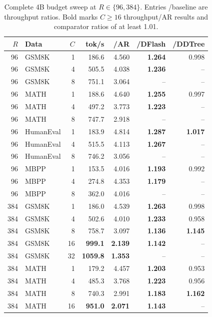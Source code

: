 \documentclass{article}
\begin{document}
\begin{table}[H]
\caption{Complete 4B budget sweep at $R\in\{96,384\}$. Entries /baseline are throughput ratios. Bold marks $C\geq16$ throughput/AR results and comparator ratios of at least 1.01.}
\label{tab:budget-4b}
\centering\small
\setlength{\tabcolsep}{4.5pt}
\renewcommand{\arraystretch}{1.06}
\begin{tabular}{@{}rlrrrrr@{}}
\toprule
$R$ & Data & $C$ & tok/s & /AR & /DFlash & /DDTree\\
\midrule
96 & GSM8K & 1 & 186.6 & 4.560 & \textbf{1.264} & 0.998\\
96 & GSM8K & 4 & 505.5 & 4.038 & \textbf{1.236} & --\\
96 & GSM8K & 8 & 751.1 & 3.064 & -- & --\\
96 & MATH & 1 & 188.6 & 4.640 & \textbf{1.255} & 0.997\\
96 & MATH & 4 & 497.2 & 3.773 & \textbf{1.223} & --\\
96 & MATH & 8 & 747.7 & 2.918 & -- & --\\
96 & HumanEval & 1 & 183.9 & 4.814 & \textbf{1.287} & \textbf{1.017}\\
96 & HumanEval & 4 & 515.5 & 4.113 & \textbf{1.267} & --\\
96 & HumanEval & 8 & 746.2 & 3.056 & -- & --\\
96 & MBPP & 1 & 153.5 & 4.016 & \textbf{1.193} & 0.992\\
96 & MBPP & 4 & 274.8 & 4.353 & \textbf{1.179} & --\\
96 & MBPP & 8 & 362.0 & 4.016 & -- & --\\
384 & GSM8K & 1 & 186.0 & 4.539 & \textbf{1.263} & 0.998\\
384 & GSM8K & 4 & 502.6 & 4.010 & \textbf{1.233} & 0.958\\
384 & GSM8K & 8 & 758.7 & 3.097 & \textbf{1.136} & \textbf{1.145}\\
384 & GSM8K & 16 & \textbf{999.1} & \textbf{2.139} & \textbf{1.142} & --\\
384 & GSM8K & 32 & \textbf{1059.8} & \textbf{1.353} & -- & --\\
384 & MATH & 1 & 179.2 & 4.457 & \textbf{1.203} & 0.953\\
384 & MATH & 4 & 485.3 & 3.768 & \textbf{1.223} & 0.956\\
384 & MATH & 8 & 740.3 & 2.991 & \textbf{1.183} & \textbf{1.162}\\
384 & MATH & 16 & \textbf{951.0} & \textbf{2.071} & \textbf{1.143} & --\\

\end{tabular}
\end{table}
\end{document}
